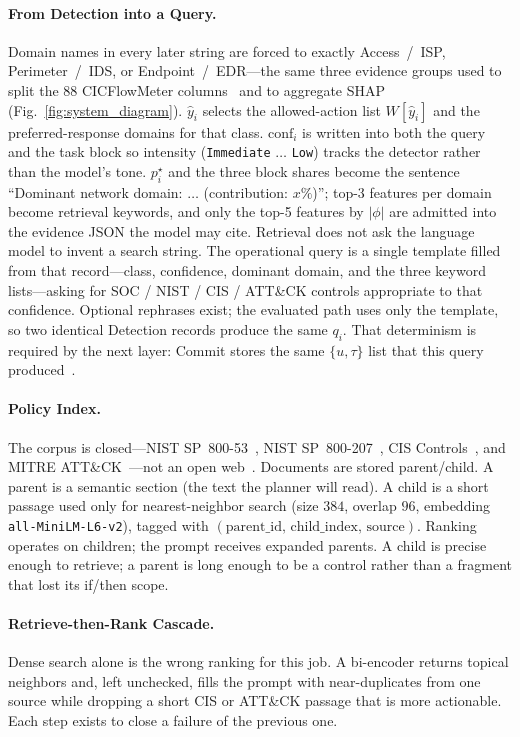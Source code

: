 \documentclass[10pt, conference]{IEEEtran}
\begin{document}
\paragraph{From Detection into a Query.}
Domain names in every later string are forced to exactly Access~/~ISP, Perimeter~/~IDS, or Endpoint~/~EDR---the same three evidence groups used to split the 88 CICFlowMeter columns~\cite{sharafaldin2018} and to aggregate SHAP (Fig.~\ref{fig:system_diagram}). $\hat{y}_i$ selects the allowed-action list $W[\hat{y}_i]$ and the preferred-response domains for that class. $\mathrm{conf}_i$ is written into both the query and the task block so intensity (\texttt{Immediate} $\ldots$ \texttt{Low}) tracks the detector rather than the model's tone. $p_i^{\star}$ and the three block shares become the sentence ``Dominant network domain: $\ldots$ (contribution: $x\%$)''; top-3 features per domain become retrieval keywords, and only the top-5 features by $\lvert\phi\rvert$ are admitted into the evidence JSON the model may cite. Retrieval does not ask the language model to invent a search string. The operational query is a single template filled from that record---class, confidence, dominant domain, and the three keyword lists---asking for SOC / NIST / CIS / ATT\&CK controls appropriate to that confidence. Optional rephrases exist; the evaluated path uses only the template, so two identical Detection records produce the same $q_i$. That determinism is required by the next layer: Commit stores the same $\{u,\tau\}$ list that this query produced~\cite{zhang2024exploit}.

\paragraph{Policy Index.}
The corpus is closed---NIST SP~800-53~\cite{nist80053}, NIST SP~800-207~\cite{nist800207}, CIS Controls~\cite{cisv8}, and MITRE ATT\&CK~\cite{mitre_attack}---not an open web~\cite{shajarian2026,fu2026}. Documents are stored parent/child. A parent is a semantic section (the text the planner will read). A child is a short passage used only for nearest-neighbor search (size $384$, overlap $96$, embedding \texttt{all-MiniLM-L6-v2}), tagged with $(\mathrm{parent\_id},\,\mathrm{child\_index},\,\mathrm{source})$. Ranking operates on children; the prompt receives expanded parents. A child is precise enough to retrieve; a parent is long enough to be a control rather than a fragment that lost its if/then scope.

\paragraph{Retrieve-then-Rank Cascade.}
Dense search alone is the wrong ranking for this job. A bi-encoder returns topical neighbors and, left unchecked, fills the prompt with near-duplicates from one source while dropping a short CIS or ATT\&CK passage that is more actionable. Each step exists to close a failure of the previous one.
\end{document}
